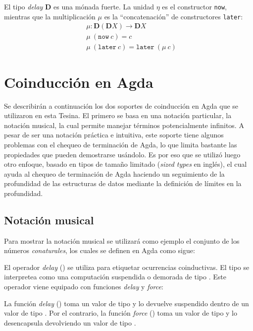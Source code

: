 El tipo \textit{delay} $\mathbf{D}$ es una mónada fuerte. La unidad $\eta$ es el constructor \texttt{now}, mientras que la multiplicación $\mu$ es la ``concatenación'' de constructores \texttt{later}:
\begin{align*}
& \mu : \mathbf{D} (\mathbf{D} X) \rightarrow \mathbf{D} X  \\
& \mu \ (\mathtt{now} \ c) = c \\
& \mu \ (\mathtt{later} \ c) = \mathtt{later} \ (\mu \ c)
\end{align*}

\section{Coinducción en Agda}\label{coind:agda}

Se describirán a continuación los dos soportes de coinducción en Agda que se utilizaron en esta Tesina. El primero se basa en una notación particular, la notación musical, la cual permite manejar términos potencialmente infinitos. A pesar de ser una notación práctica e intuitiva, este soporte tiene algunos problemas con el chequeo de terminación de Agda, lo que limita bastante las propiedades que pueden demostrarse usándolo. Es por eso que se utilizó luego otro enfoque, basado en tipos de tamaño limitado (\textit{sized types} en inglés), el cual ayuda al chequeo de terminación de Agda haciendo un seguimiento de la profundidad de las estructuras de datos mediante la definición de límites en la profundidad. 

\subsection{Notación musical}\label{coind:agda:musical}

Para mostrar la notación musical se utilizará como ejemplo el conjunto de los números \textit{conaturales}, los cuales se definen en Agda como sigue:


El operador \textit{delay} (\AgdaDatatype{$\infty$}) se utiliza para etiquetar ocurrencias coinductivas. El tipo  se interpretea como una computación suspendida o demorada de tipo . Este operador viene equipado con funciones \textit{delay} y \textit{force}:


La función \textit{delay} (\AgdaFunction{$\sharp\_$}) toma un valor de tipo  y lo devuelve suspendido dentro de un valor de tipo . Por el contrario, la función \textit{force} (\AgdaFunction{$\flat$}) toma un valor de tipo  y lo desencapsula devolviendo un valor de tipo .

